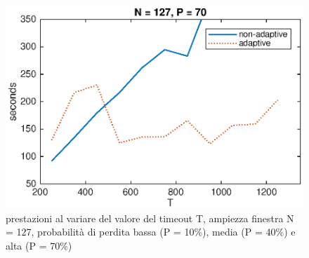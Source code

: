 \begin{figure}[!hp]
	\includegraphics[scale=0.8]{images/T_N127_P70}
	\caption{prestazioni al variare del valore del timeout T,
			 ampiezza finestra N = 127, probabilità di perdita bassa (P = 10\%),
			 media (P = 40\%) e alta (P = 70\%)}
	\label{t}
\end{figure}
